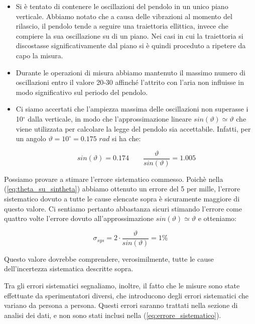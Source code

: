 \begin{itemize}
    \item{Si è tentato di contenere le oscillazioni del pendolo in un
        unico piano verticale. Abbiamo notato che a causa delle
        vibrazioni al momento del rilascio, il pendolo tende a seguire una
        traiettoria ellittica, invece che compiere la sua oscillazione su di un piano.
        Nei casi in cui la traiettoria si discostasse significativamente dal piano
        si è quindi proceduto a ripetere da capo la misura.}
    
    \item{Durante le operazioni di misura abbiamo mantenuto il massimo numero
        di oscillazioni entro il valore 20-30 affinché l'attrito con l'aria
        non influisse in modo significativo sul periodo del pendolo.}

    \item{Ci siamo accertati che l'ampiezza massima delle
        oscillazioni non superasse i 10$^\circ$ dalla verticale, in modo che
        l'approssimazione lineare $sin(\vartheta) \simeq \vartheta$ che viene
        utilizzata per calcolare la legge del pendolo sia accettabile. Infatti, per un
        angolo $\vartheta = 10^\circ = 0.175 \,\, rad$ si ha che:}

    \begin{equation}
        sin(\vartheta) = 0.174 \qquad \frac{\vartheta}{sin(\vartheta)} = 1.005
        \label{eq:theta_su_sintheta}
    \end{equation}

\end{itemize}

Possiamo provare a stimare l'errore sistematico commesso. Poichè nella (\ref{eq:theta_su_sintheta})
abbiamo ottenuto un errore del 5 per mille, l'errore sistematico dovuto a tutte le
cause elencate sopra è sicuramente maggiore di questo valore. Ci sentiamo pertanto abbastanza
sicuri stimando l'errore come quattro volte l'errore dovuto all'approssimazione $sin(\vartheta) \simeq \vartheta$ e otteniamo:

\begin{equation}
    \sigma_{sys} = 2 \cdot \frac{\vartheta}{sin(\vartheta)} = 1 \%
    \label{eq:errore_sistematico}
\end{equation}

Questo valore dovrebbe comprendere, verosimilmente, tutte le cause dell'incertezza sistematica descritte sopra.

Tra gli errori sistematici segnaliamo, inoltre, il fatto che le misure sono state
effettuate da sperimentatori diversi, che introducono degli errori sistematici
che variano da persona a persona. Questi errori saranno trattati nella sezione
di analisi dei dati, e non sono stati inclusi nella (\ref{eq:errore_sistematico}).

